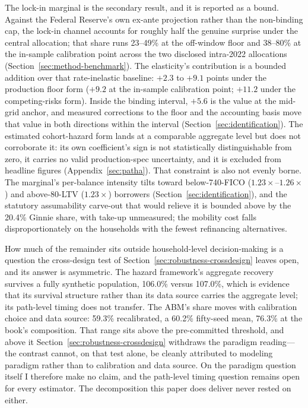 The lock-in marginal is the secondary result, and it is reported as a bound. Against the Federal Reserve's own ex-ante projection rather than the non-binding cap, the lock-in channel accounts for roughly half the genuine surprise under the central allocation; that share runs 23--49\% at the off-window floor and 38--80\% at the in-sample calibration point across the two disclosed intra-2022 allocations (Section~\ref{sec:method-benchmark}). The elasticity's contribution is a bounded addition over that rate-inelastic baseline: $+2.3$ to $+9.1$ points under the production floor form ($+9.2$ at the in-sample calibration point; $+11.2$ under the competing-risks form). Inside the binding interval, $+5.6$ is the value at the mid-grid anchor, and measured corrections to the floor and the accounting basis move that value in both directions within the interval (Section~\ref{sec:identification}). The estimated cohort-hazard form lands at a comparable aggregate level but does not corroborate it: its own coefficient's sign is not statistically distinguishable from zero, it carries no valid production-spec uncertainty, and it is excluded from headline figures (Appendix~\ref{sec:patha}). That constraint is also not evenly borne. The marginal's per-balance intensity tilts toward below-740-FICO ($1.23\times$--$1.26\times$) and above-80-LTV ($1.23\times$) borrowers (Section~\ref{sec:identification}), and the statutory assumability carve-out that would relieve it is bounded above by the 20.4\% Ginnie share, with take-up unmeasured; the mobility cost falls disproportionately on the households with the fewest refinancing alternatives.

How much of the remainder sits outside household-level decision-making is a question the cross-design test of Section~\ref{sec:robustness-crossdesign} leaves open, and its answer is asymmetric. The hazard framework's aggregate recovery survives a fully synthetic population, 106.0\% versus 107.0\%, which is evidence that its survival structure rather than its data source carries the aggregate level; its path-level timing does not transfer. The ABM's share moves with calibration choice and data source: 59.3\% recalibrated, a 60.2\% fifty-seed mean, 76.3\% at the book's composition. That range sits above the pre-committed threshold, and above it Section~\ref{sec:robustness-crossdesign} withdraws the paradigm reading---the contrast cannot, on that test alone, be cleanly attributed to modeling paradigm rather than to calibration and data source. On the paradigm question itself I therefore make no claim, and the path-level timing question remains open for every estimator. The decomposition this paper does deliver never rested on either.

